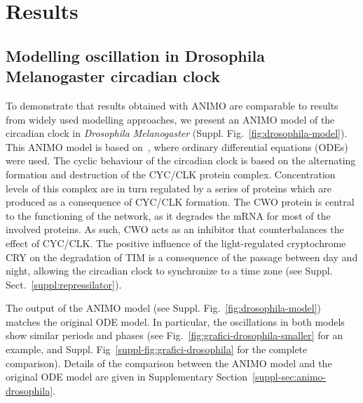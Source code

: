\documentclass{bmcart}
\def\tas{Timed Automata}
\begin{document}



\section*{Results}\label{sec:results}
\subsection*{Modelling oscillation in Drosophila Melanogaster circadian clock}\label{sec:animo-drosophila}
To demonstrate that results obtained with ANIMO are comparable to results from widely used modelling
approaches, we present 
an ANIMO model of the circadian clock in \emph{Drosophila Melanogaster} (Suppl. Fig.~\ref{fig:drosophila-model}).
This ANIMO model is based on~\cite{drosophila-ode-model},
where ordinary differential equations (ODEs) were used.
The cyclic behaviour of the circadian clock is based on the alternating formation and destruction of the
CYC/CLK protein complex.
Concentration levels of this complex are in turn regulated by a series of proteins which are produced as
a consequence of CYC/CLK formation. The CWO protein
is central to the functioning of the network, as it degrades the mRNA for most of the involved proteins.
As such, CWO acts as an inhibitor that counterbalances the effect of CYC/CLK.
The positive influence of the light-regulated cryptochrome CRY on the degradation of TIM is a consequence
of the passage between day and night, allowing
the circadian clock to synchronize to a time zone (see Suppl. Sect.~\ref{suppl:repressilator}).


The output of the ANIMO model (see Suppl. Fig.~\ref{fig:drosophila-model}) matches the original ODE model.
In particular, the oscillations in both models show similar periods and phases (see Fig.~\ref{fig:grafici-drosophila-smaller} for
an example, and Suppl. Fig~\ref{suppl-fig:grafici-drosophila} for the complete comparison).
Details of the comparison
between the ANIMO model and the original ODE model are given in Supplementary Section~\ref{suppl-sec:animo-drosophila}.
\end{document}
